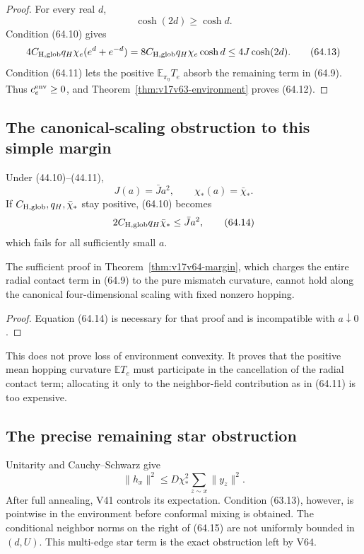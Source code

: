 \documentclass[11pt]{article}
\theoremstyle{remark}
\begin{document}
\begin{proof}
For every real \(d\),
\[
 \cosh(2d)\geq\cosh d.
\]
Condition (64.10) gives
\[
 4C_{\rm H,glob}q_H\chi_e(e^d+e^{-d})
 =
 8C_{\rm H,glob}q_H\chi_e\cosh d
 \leq4J\cosh(2d).                                 \tag{64.13}
\]
Condition (64.11) lets the positive
\(\mathbb E_{\pi_\eta}T_e\) absorb the remaining term in (64.9).
Thus \(c_e^{\rm env}\geq0\), and
Theorem~\ref{thm:v17v63-environment} proves (64.12).
\end{proof}

\subsection{The canonical-scaling obstruction to this simple margin}

Under (44.10)--(44.11),
\[
 J(a)=\bar Ja^2,\qquad\chi_*(a)=\bar\chi_*.
\]
If \(C_{\rm H,glob},q_H,\bar\chi_*\) stay positive, (64.10) becomes
\[
 2C_{\rm H,glob}q_H\bar\chi_*
 \leq\bar Ja^2,                                   \tag{64.14}
\]
which fails for all sufficiently small \(a\).

\begin{countertheorem}
\label{ctr:v17v64-scaling}
The sufficient proof in Theorem~\ref{thm:v17v64-margin}, which charges
the entire radial contact term in (64.9) to the pure mismatch
curvature, cannot hold along the canonical four-dimensional scaling
with fixed nonzero hopping.
\end{countertheorem}

\begin{proof}
Equation (64.14) is necessary for that proof and is incompatible with
\(a\downarrow0\).
\end{proof}

This does not prove loss of environment convexity.  It proves that the
positive mean hopping curvature \(\mathbb ET_e\) must participate in
the cancellation of the radial contact term; allocating it only to
the neighbor-field contribution as in (64.11) is too expensive.

\subsection{The precise remaining star obstruction}

Unitarity and Cauchy--Schwarz give
\[
 \|h_x\|^2
 \leq
 D\chi_*^2\sum_{z\sim x}\|y_z\|^2.                \tag{64.15}
\]
After full annealing, V41 controls its expectation.  Condition
(63.13), however, is pointwise in the environment before conformal
mixing is obtained.  The conditional neighbor norms on the right of
(64.15) are not uniformly bounded in \((d,U)\).  This multi-edge star
term is the exact obstruction left by V64.
\end{document}
